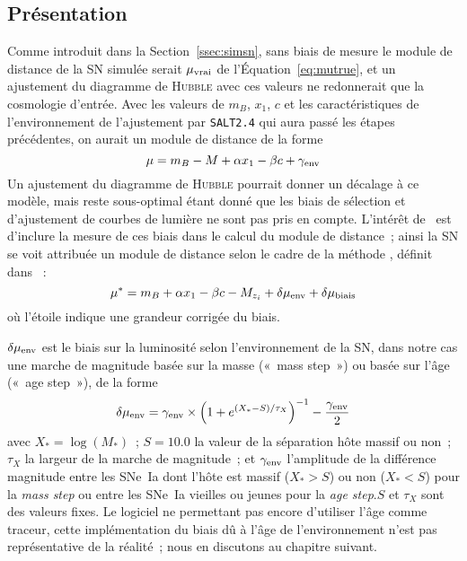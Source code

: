 \documentclass[../main/main.tex]{subfiles}
\begin{document}
\subsection{Présentation}\label{ssec:bbcintro}

Comme introduit dans la Section~\ref{ssec:simsn}, sans biais de mesure le module
de distance de la SN simulée serait $\mu_{\rm vrai}$ de
l'Équation~\ref{eq:mutrue}, et un ajustement du diagramme de \textsc{Hubble}
avec ces valeurs ne redonnerait que la cosmologie d'entrée. Avec les valeurs de
$m_B$, $x_1$, $c$ et les caractéristiques de l'environnement de l'ajustement par
\texttt{SALT2.4} qui aura passé les étapes précédentes, on aurait un module de
distance de la forme
\begin{equation}\label{eq:mu}
    \mu = m_B - M + \alpha x_1 - \beta c + \gamma_{\rm env}
\end{equation}
Un ajustement du diagramme de \textsc{Hubble} pourrait donner un décalage à ce
modèle, mais reste sous-optimal étant donné que les biais de sélection et
d'ajustement de courbes de lumière ne sont pas pris en compte. L'intérêt de
\bbc\ est d'inclure la mesure de ces biais dans le calcul du module de
distance~; ainsi la SN se voit attribuée un module de distance selon le cadre de
la méthode \bbc, définit dans \citep{popovic2021a}~:
\begin{equation}\label{eq:mucorr}
    \mu^* = m_B + \alpha x_1 - \beta c - M_{z_i} + \delta\mu_{\rm env} +
    \delta\mu _\mathrm{biais}
\end{equation}
où l'étoile indique une grandeur corrigée du biais.

$\delta\mu_{\rm env}$ est le biais sur la luminosité selon l'environnement de la
SN, dans notre cas une marche de magnitude basée sur la masse («~mass step~») ou
basée sur l'âge («~age step~»), de la forme
\begin{equation}
    \delta\mu_{\rm env} = \gamma_{\rm env}\times \left(1 + e^{(X_*-S)/\tau_X}
    \right)^{-1} - \frac{\gamma_{\rm env}}{2}
\end{equation}
avec $X_* = \log(M_*)$~; $S = \num{10.0}$ la valeur de la séparation hôte massif
ou non~; $\tau_X$ la largeur de la marche de magnitude~; et $\gamma_{\rm env}$
l'amplitude de la différence magnitude entre les SNe~Ia dont l'hôte est massif
($X_* > S$) ou non ($X_* < S$) pour la \textit{mass step} ou entre les SNe~Ia
vieilles ou jeunes pour la \textit{age step}.$S$ et $\tau_X$ sont des valeurs
fixes. Le logiciel ne permettant pas encore d'utiliser l'âge comme traceur,
cette implémentation du biais dû à l'âge de l'environnement n'est pas
représentative de la réalité~; nous en discutons au chapitre suivant. 
\end{document}
